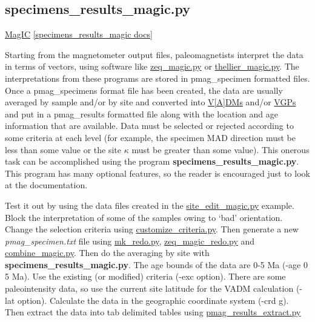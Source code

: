 \documentclass[11pt]{book}
\begin{document}
{

\subsection{specimens\_results\_magic.py}
\href{#MagIC}{MagIC}
\href{https://github.com/PmagPy/PmagPy/blob/master/programs/specimens_results_magic.py}{[specimens\_results\_magic docs]}

Starting from the magnetometer output files, paleomagnetists interpret the data in terms of vectors, using software like \href{#zeq_magic.py}{zeq\_magic.py} or \href{thellier_magic.py}{thellier\_magic.py}.  The interpretations from these programs are stored in pmag\_specimen formatted files.
Once a pmag\_specimens format file has been created, the data are usually  averaged by sample and/or by site and converted into \href{http://earthref.org/MAGIC/books/Tauxe/Essentials/WebBook3ch2.html#Virtual_dipole_moment}{V[A]DMs} and/or
\href{http://earthref.org/MAGIC/books/Tauxe/Essentials/WebBook3ch2.html#Virtual_geomagnetic_poles}{VGPs} and put in a pmag\_results formatted file along with the location and age information that are available.  Data must be selected or rejected according to some criteria at each level (for example, the specimen MAD direction must be less than some value or the site $\kappa$ must be greater than some value).   This onerous task can be accomplished using the program {\bf specimens\_results\_magic.py}.          This program has many optional features, so the reader is encouraged just to look at the documentation.

Test it out  by using the data files created in the \href{#site_edit_magic.py}{site\_edit\_magic.py} example.  Block the interpretation of some of the samples owing to `bad' orientation.  Change the selection criteria using \href{customize_criteria.py}{customize\_criteria.py}.    Then generate a new {\it pmag\_specimen.txt} file using \href{#mk_redo.py}{mk\_redo.py},  \href{#zeq_magic_redo.py}{zeq\_magic\_redo.py} and \href{#combine_magic.py}{combine\_magic.py}.   Then do the averaging by site with {\bf specimens\_results\_magic.py}.  The age bounds of the data are 0-5 Ma (-age 0 5 Ma).  Use the existing (or modified) criteria (-exc option).   There are some paleointensity data, so use the current site latitude for the VADM  calculation (-lat option).   Calculate the data in the geographic coordinate system (-crd g).    Then extract the data into tab delimited tables using \href{#pmag_results_extract.py}{pmag\_results\_extract.py}

}
\end{document}
